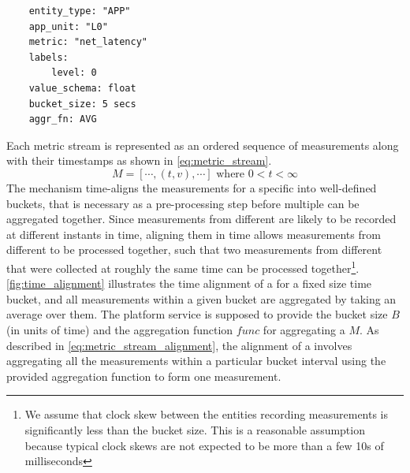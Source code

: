 \begin{itemize}
\begin{verbatim}
    entity_type: "APP"
    app_unit: "L0"
    metric: "net_latency"
    labels:
        level: 0
    value_schema: float
    bucket_size: 5 secs
    aggr_fn: AVG
\end{verbatim}
Each metric stream is represented as an ordered sequence of measurements along with their timestamps as shown in \cref{eq:metric_stream}.
\begin{equation}
M = \left[ \cdots , \left( t, v \right) , \cdots \right] \text{ where } 0 < t < \infty
\label{eq:metric_stream}
\end{equation}
The mechanism time-aligns the measurements for a specific  into well-defined buckets, that is necessary as a pre-processing step before multiple  can be aggregated together. Since measurements from different  are likely to be recorded at different instants in time, aligning them in time allows measurements from different  to be processed together, such that two measurements from different  that were collected at roughly the same time can be processed together\footnote{We assume that clock skew between the entities recording measurements is significantly less than the bucket size. This is a reasonable assumption because typical clock skews are not expected to be more than a few 10s of milliseconds}.
\cref{fig:time_alignment} illustrates the time alignment of a  for a fixed size time bucket, and all measurements within a given bucket are aggregated by taking an average over them. The platform service is supposed to provide the bucket size $B$ (in units of time) and the aggregation function $func$ for aggregating a  $M$. As described in \cref{eq:metric_stream_alignment}, the alignment of a  involves aggregating all the measurements within a particular bucket interval using the provided aggregation function to form one measurement.

\end{itemize}
